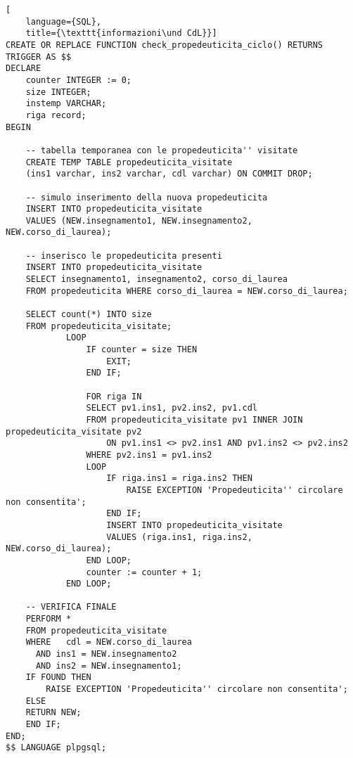 \documentclass{article}
\newcommand{\und}[0]{\textunderscore}
\begin{document}
\begin{lstlisting}[
    language={SQL},
    title={\texttt{informazioni\und CdL}}]
CREATE OR REPLACE FUNCTION check_propedeuticita_ciclo() RETURNS TRIGGER AS $$
DECLARE
    counter INTEGER := 0;
    size INTEGER;
    instemp VARCHAR;
    riga record;
BEGIN

    -- tabella temporanea con le propedeuticita'' visitate
    CREATE TEMP TABLE propedeuticita_visitate
    (ins1 varchar, ins2 varchar, cdl varchar) ON COMMIT DROP;

    -- simulo inserimento della nuova propedeuticita
    INSERT INTO propedeuticita_visitate
    VALUES (NEW.insegnamento1, NEW.insegnamento2, NEW.corso_di_laurea);

    -- inserisco le propedeuticita presenti
    INSERT INTO propedeuticita_visitate
    SELECT insegnamento1, insegnamento2, corso_di_laurea
    FROM propedeuticita WHERE corso_di_laurea = NEW.corso_di_laurea;

    SELECT count(*) INTO size
    FROM propedeuticita_visitate;
            LOOP
                IF counter = size THEN
                    EXIT;
                END IF;

                FOR riga IN
                SELECT pv1.ins1, pv2.ins2, pv1.cdl
                FROM propedeuticita_visitate pv1 INNER JOIN  propedeuticita_visitate pv2
                    ON pv1.ins1 <> pv2.ins1 AND pv1.ins2 <> pv2.ins2
                WHERE pv2.ins1 = pv1.ins2
                LOOP
                    IF riga.ins1 = riga.ins2 THEN
                        RAISE EXCEPTION 'Propedeuticita'' circolare non consentita';
                    END IF;
                    INSERT INTO propedeuticita_visitate
                    VALUES (riga.ins1, riga.ins2, NEW.corso_di_laurea);
                END LOOP;
                counter := counter + 1;
            END LOOP;

    -- VERIFICA FINALE
    PERFORM *
    FROM propedeuticita_visitate
    WHERE   cdl = NEW.corso_di_laurea
      AND ins1 = NEW.insegnamento2
      AND ins2 = NEW.insegnamento1;
    IF FOUND THEN
        RAISE EXCEPTION 'Propedeuticita'' circolare non consentita';
    ELSE
    RETURN NEW;
    END IF;
END;
$$ LANGUAGE plpgsql;
\end{lstlisting}

\pagebreak
\end{document}
